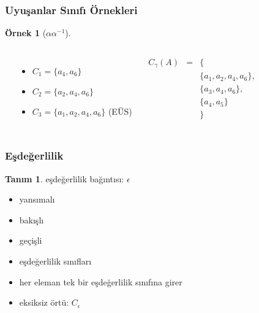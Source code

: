 \documentclass[dvipsnames]{beamer}
\theoremstyle{definition}
\newtheorem{tanim}[theorem]{Tanım}
\theoremstyle{example}
\newtheorem{ornek}[theorem]{Örnek}
\theoremstyle{plain}
\begin{document}
\begin{frame}
  \frametitle{Uyuşanlar Sınıfı Örnekleri}

  \begin{ornek}[$\alpha \alpha^{-1}$]
    \begin{columns}
      \begin{center}
      \end{center}

      \pause
      \begin{itemize}
        \item $C_1=\{a_4,a_6\}$
        \item $C_2=\{a_2,a_4,a_6\}$
        \item $C_3=\{a_1,a_2,a_4,a_6\}$ (EÜS)
      \end{itemize}

      \pause
      \medskip
      \begin{eqnarray*}
        C_\gamma (A) & = & \{\\
                      &   & \{a_1,a_2,a_4,a_6\},\\
                      &   & \{a_3,a_4,a_6\},\\
                      &   & \{a_4,a_5\}\\
                      &   & \}
      \end{eqnarray*}
    \end{columns}
  \end{ornek}
\end{frame}

\begin{frame}
  \frametitle{Eşdeğerlilik}

  \begin{tanim}
    \alert{eşdeğerlilik bağıntısı}: $\epsilon$
    \begin{itemize}
      \item yansımalı
      \item bakışlı
      \item geçişli
    \end{itemize}
  \end{tanim}

  \pause
  \begin{itemize}
    \item eşdeğerlilik sınıfları
    \item her eleman tek bir eşdeğerlilik sınıfına girer

    \pause
    \medskip
    \item eksiksiz örtü: $C_\epsilon$
  \end{itemize}
\end{frame}
\end{document}
